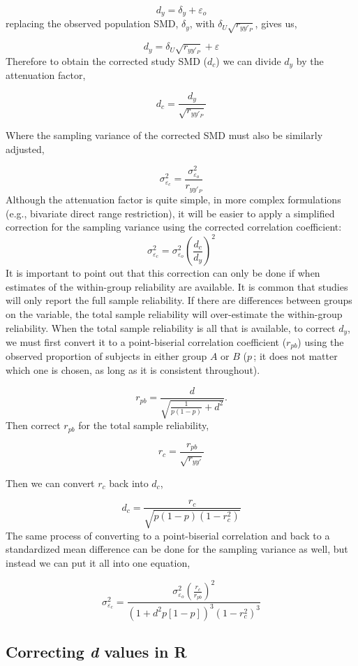 \documentclass[
  letterpaper,
  DIV=11,
  numbers=noendperiod]{scrreprt}
\begin{document}
\[
d_y = \delta_y + \varepsilon_o
\] replacing the observed population SMD, \(\delta_y\), with
\(\delta_U\sqrt{r_{yy'_P}}\), gives us,

\[
d_y = \delta_U\sqrt{r_{yy'_P}} + \varepsilon
\] Therefore to obtain the corrected study SMD (\(d_c\)) we can divide
\(d_y\) by the attenuation factor,

\[
d_c = \frac{d_y}{\sqrt{r_{yy'_P}}}
\]

Where the sampling variance of the corrected SMD must also be similarly
adjusted,

\[
\sigma^2_{\varepsilon_c} = \frac{\sigma^2_{\varepsilon_o}}{r_{yy'_P}}
\] Although the attenuation factor is quite simple, in more complex
formulations (e.g., bivariate direct range restriction), it will be
easier to apply a simplified correction for the sampling variance using
the corrected correlation coefficient: \[
\sigma^2_{\varepsilon_c} = \sigma^2_{\varepsilon_o}\left(\frac{d_c}{d_y}\right)^2
\] It is important to point out that this correction can only be done if
when estimates of the within-group reliability are available. It is
common that studies will only report the full sample reliability. If
there are differences between groups on the variable, the total sample
reliability will over-estimate the within-group reliability. When the
total sample reliability is all that is available, to correct \(d_y\),
we must first convert it to a point-biserial correlation coefficient
(\(r_{pb}\)) using the observed proportion of subjects in either group
\(A\) or \(B\) (\(p\,\); it does not matter which one is chosen, as long
as it is consistent throughout).

\[
r_{pb} = \frac{d}{\sqrt{\frac{1}{p(1-p)}+d^2}}.
\] Then correct \(r_{pb}\) for the total sample reliability,

\[
r_c = \frac{r_{pb}}{\sqrt{r_{yy'}}}
\]

Then we can convert \(r_c\) back into \(d_c\),

\[
d_c = \frac{r_c}{\sqrt{p(1-p)(1-r_c^2)}}
\] The same process of converting to a point-biserial correlation and
back to a standardized mean difference can be done for the sampling
variance as well, but instead we can put it all into one equation,

\[
\sigma^2_{\varepsilon_c} = \frac {\sigma^2_{\varepsilon_o}\left(\frac{r_c}{r_{pb}}\right)^2} {\left(1+d^2p[1-p]\right)^3(1-r_c^2)^3}
\]

\hypertarget{correcting-d-values-in-r}{%
\subsection{\texorpdfstring{Correcting \emph{d} values in
R}{Correcting d values in R}}\label{correcting-d-values-in-r}}
\end{document}
